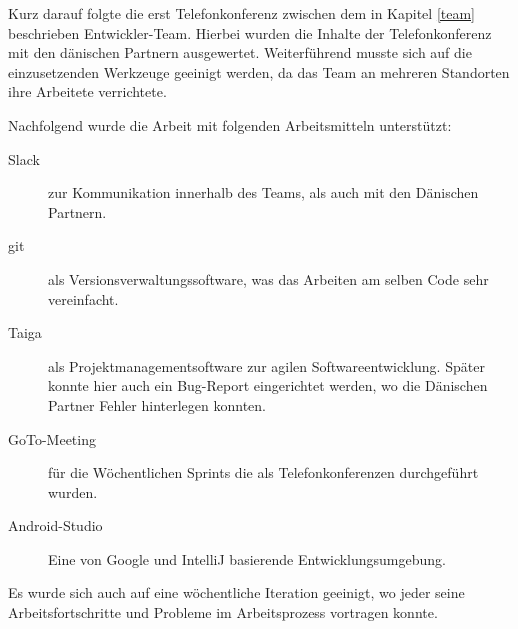 Kurz darauf folgte die erst Telefonkonferenz zwischen dem in Kapitel \ref{team} beschrieben Entwickler-Team. Hierbei wurden die Inhalte der Telefonkonferenz mit den dänischen Partnern ausgewertet.
Weiterführend musste sich auf die einzusetzenden  Werkzeuge geeinigt werden, da das Team an mehreren Standorten ihre Arbeitete verrichtete.

Nachfolgend wurde die Arbeit mit folgenden Arbeitsmitteln unterstützt:
\begin{description}
	\item[Slack] zur Kommunikation innerhalb des Teams, als auch mit den Dänischen Partnern.
	\item[\gls{git}] als Versionsverwaltungssoftware, was das Arbeiten am selben Code sehr vereinfacht.
	\item[Taiga] als Projektmanagementsoftware zur agilen Softwareentwicklung. Später konnte hier auch ein Bug-Report eingerichtet werden, wo die Dänischen Partner Fehler hinterlegen konnten.
	\item[GoTo-Meeting] für die Wöchentlichen Sprints die als  Telefonkonferenzen durchgeführt wurden.
	\item[Android-Studio] Eine von Google und IntelliJ  basierende Entwicklungsumgebung.
\end{description}
 Es wurde sich auch auf eine wöchentliche Iteration geeinigt, wo jeder seine Arbeitsfortschritte und  Probleme im Arbeitsprozess vortragen  konnte.
 

